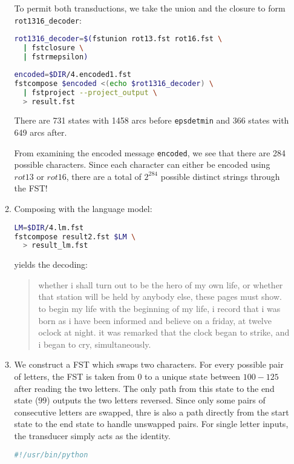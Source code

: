 \documentclass[a4paper,oneside,reqno]{amsart}
\begin{document}
\begin{enumerate}[label=\arabic*.]
\begin{enumerate}[label=(\alph*)]
    To permit both transductions, we take the union and the closure
    to form \texttt{rot1316\_decoder}:
    \begin{lstlisting}[language=bash]
rot1316_decoder=$(fstunion rot13.fst rot16.fst \
  | fstclosure \
  | fstrmepsilon)
    \end{lstlisting}

    \begin{lstlisting}[language=bash]
encoded=$DIR/4.encoded1.fst
fstcompose $encoded <(echo $rot1316_decoder) \
  | fstproject --project_output \
  > result.fst
    \end{lstlisting}
    There are 731 states with 1458 arcs before \texttt{epsdetmin} and
    366 states with 649 arcs after.

    From examining the encoded message \texttt{encoded}, we see that there are
    284 possible characters.  Since each character can either be encoded using
    $rot13$ or $rot16$, there are a total of $2^284$ possible distinct strings
    through the FST!


  \item Composing with the language model:
    \begin{lstlisting}[language=bash]
LM=$DIR/4.lm.fst
fstcompose result2.fst $LM \
  > result_lm.fst
    \end{lstlisting}
    yields the decoding:
    \begin{quote}
      whether i shall turn out to be the hero of my own life, or whether that
      station will be held by anybody else, these pages must show. to begin my
      life with the beginning of my life, i record that i was born as i have
      been informed and believe on a friday, at twelve oclock at night. it was
      remarked that the clock began to strike, and i began to cry,
      simultaneously.
    \end{quote}

  \item We construct a FST which swaps two characters.  For every
    possible pair of letters, the FST is taken from $0$ to a unique state
    between $100-125$ after reading the two letters. The only path from this
    state to the end state ($99$) outputs the two letters reversed. Since only
    some pairs of consecutive letters are swapped, thre is also a path directly
    from the start state to the end state to handle unswapped pairs. For single
    letter inputs, the transducer simply acts as the identity.
    \begin{lstlisting}[language=python]
#!/usr/bin/python


\end{lstlisting}
\end{enumerate}
\end{enumerate}
\end{document}
